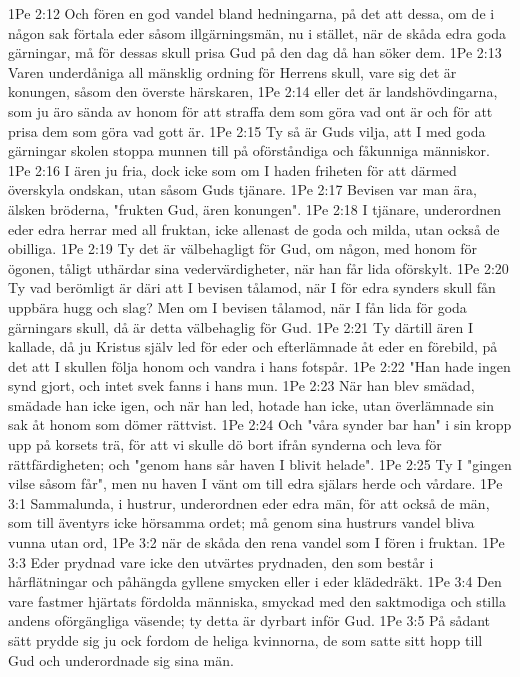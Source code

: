 1Pe 2:12  Och fören en god vandel bland hedningarna, på det att dessa, om de i någon sak förtala eder såsom illgärningsmän, nu i stället, när de skåda edra goda gärningar, må för dessas skull prisa Gud på den dag då han söker dem.
1Pe 2:13  Varen underdåniga all mänsklig ordning för Herrens skull, vare sig det är konungen, såsom den överste härskaren,
1Pe 2:14  eller det är landshövdingarna, som ju äro sända av honom för att straffa dem som göra vad ont är och för att prisa dem som göra vad gott är.
1Pe 2:15  Ty så är Guds vilja, att I med goda gärningar skolen stoppa munnen till på oförståndiga och fåkunniga människor.
1Pe 2:16  I ären ju fria, dock icke som om I haden friheten för att därmed överskyla ondskan, utan såsom Guds tjänare.
1Pe 2:17  Bevisen var man ära, älsken bröderna, "frukten Gud, ären konungen".
1Pe 2:18  I tjänare, underordnen eder edra herrar med all fruktan, icke allenast de goda och milda, utan också de obilliga.
1Pe 2:19  Ty det är välbehagligt för Gud, om någon, med honom för ögonen, tåligt uthärdar sina vedervärdigheter, när han får lida oförskylt.
1Pe 2:20  Ty vad berömligt är däri att I bevisen tålamod, när I för edra synders skull fån uppbära hugg och slag? Men om I bevisen tålamod, när I fån lida för goda gärningars skull, då är detta välbehaglig för Gud.
1Pe 2:21  Ty därtill ären I kallade, då ju Kristus själv led för eder och efterlämnade åt eder en förebild, på det att I skullen följa honom och vandra i hans fotspår.
1Pe 2:22  "Han hade ingen synd gjort, och intet svek fanns i hans mun.
1Pe 2:23  När han blev smädad, smädade han icke igen, och när han led, hotade han icke, utan överlämnade sin sak åt honom som dömer rättvist.
1Pe 2:24  Och "våra synder bar han" i sin kropp upp på korsets trä, för att vi skulle dö bort ifrån synderna och leva för rättfärdigheten; och "genom hans sår haven I blivit helade".
1Pe 2:25  Ty I "gingen vilse såsom får", men nu haven I vänt om till edra själars herde och vårdare.
1Pe 3:1  Sammalunda, i hustrur, underordnen eder edra män, för att också de män, som till äventyrs icke hörsamma ordet; må genom sina hustrurs vandel bliva vunna utan ord,
1Pe 3:2  när de skåda den rena vandel som I fören i fruktan.
1Pe 3:3  Eder prydnad vare icke den utvärtes prydnaden, den som består i hårflätningar och påhängda gyllene smycken eller i eder klädedräkt.
1Pe 3:4  Den vare fastmer hjärtats fördolda människa, smyckad med den saktmodiga och stilla andens oförgängliga väsende; ty detta är dyrbart inför Gud.
1Pe 3:5  På sådant sätt prydde sig ju ock fordom de heliga kvinnorna, de som satte sitt hopp till Gud och underordnade sig sina män.
